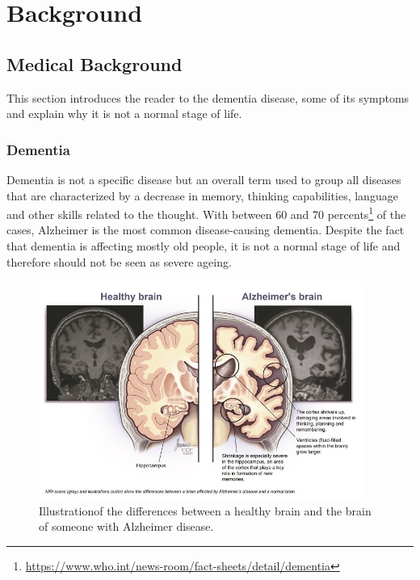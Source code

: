 \chapter{Background}
\label{chap:background}

\section{Medical Background}
This section introduces the reader to the dementia disease, some of its symptoms and explain why it is not a normal stage of life. 

\label{sec:medical_background}

\subsection{Dementia}
Dementia is not a specific disease but an overall term used to group all diseases that are characterized by a decrease in memory, thinking capabilities, language and other skills related to the thought. With between 60 and 70 percents\footnote{\href{https://www.who.int/news-room/fact-sheets/detail/dementia}{https://www.who.int/news-room/fact-sheets/detail/dementia}} of the cases, Alzheimer is the most common disease-causing dementia. Despite the fact that dementia is affecting mostly old people, it is not a normal stage of life and therefore should not be seen as severe ageing.

\begin{figure}
 \centering
 \includegraphics[width=400]{figures/Alzheimer_brain.jpg}
 \caption[Test]{Illustration\footnotemark of the differences between a healthy brain and the brain of someone with Alzheimer disease.}
 \label{fig:alzheimerbrain}
\end{figure}

